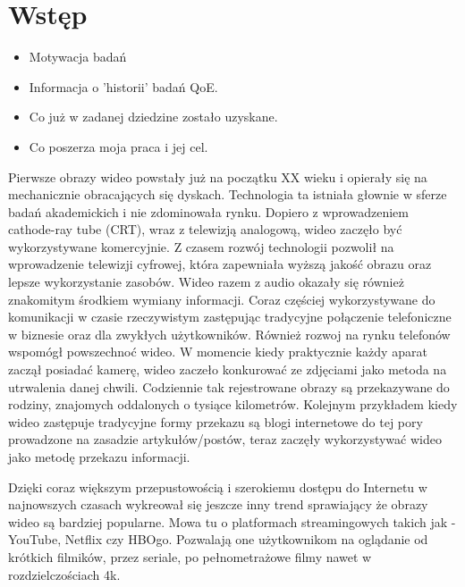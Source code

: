 \chapter{Wstęp}
\label{cha:pierwszyDokument}




\begin{itemize}
\item Motywacja badań
\item Informacja o  'historii' badań QoE.
\item Co już w zadanej dziedzine zostało uzyskane.
\item Co poszerza moja  praca i jej cel.
\end{itemize}

Pierwsze obrazy wideo powstały już na początku XX wieku i opierały się na mechanicznie obracających się dyskach. Technologia ta istniała głownie w sferze badań akademickich i nie zdominowała rynku. Dopiero z wprowadzeniem cathode-ray tube (CRT), wraz z telewizją analogową, wideo zaczęło być wykorzystywane komercyjnie.  Z czasem rozwój technologii pozwolił na wprowadzenie telewizji cyfrowej, która zapewniała wyższą jakość obrazu oraz lepsze wykorzystanie zasobów. Wideo razem z audio okazały się również znakomitym środkiem wymiany informacji. Coraz częściej wykorzystywane do komunikacji w czasie rzeczywistym zastępując tradycyjne połączenie telefoniczne w biznesie oraz dla zwykłych użytkowników. Również rozwoj na rynku telefonów wspomógł powszechnoć wideo. W momencie kiedy praktycznie każdy aparat  zaczął posiadać kamerę, wideo zaczeło konkurować ze zdjęciami jako metoda na utrwalenia danej chwili. Codziennie tak rejestrowane obrazy są przekazywane do rodziny, znajomych oddalonych o tysiące kilometrów. Kolejnym przykładem kiedy wideo zastępuje tradycyjne formy przekazu są  blogi internetowe do tej pory prowadzone na zasadzie artykułów/postów, teraz zaczęły wykorzystywać wideo jako metodę  przekazu informacji.

Dzięki coraz większym przepustowością i szerokiemu dostępu do Internetu w najnowszych czasach wykreował się jeszcze inny trend sprawiający że obrazy wideo są bardziej popularne. Mowa tu o platformach streamingowych takich jak - YouTube, Netflix czy HBOgo. Pozwalają one użytkownikom na oglądanie od krótkich filmików, przez seriale, po pełnometrażowe filmy nawet w rozdzielczościach 4k. \par


